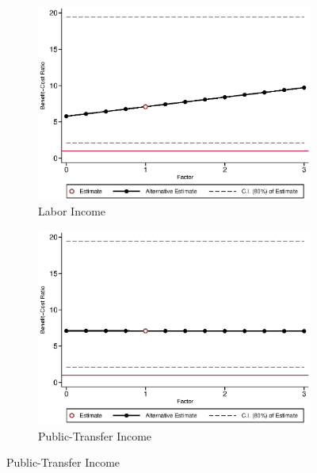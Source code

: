 \begin{figure}[H]
\caption{Benefit-Cost Ratio vs.~Components, Males} \label{fig:bcrf_factor_m}
	
	\begin{subfigure}[h]{0.8\textwidth}
	\centering
	\caption{Labor Income} \label{fig:bcrf_inc_labor_m1}
	\includegraphics[width=\textwidth]{AppOutput/Sensitivity/bcrf_inc_labor_m1.eps}
	\end{subfigure}
	
	\begin{subfigure}[h]{0.8\textwidth}
	\centering
	\caption{Public-Transfer Income} \label{fig:bcrf_transfer_m1}
	\includegraphics[width=\textwidth]{AppOutput/Sensitivity/bcrf_transfer_m1.eps}
	\end{subfigure}
\end{figure}

